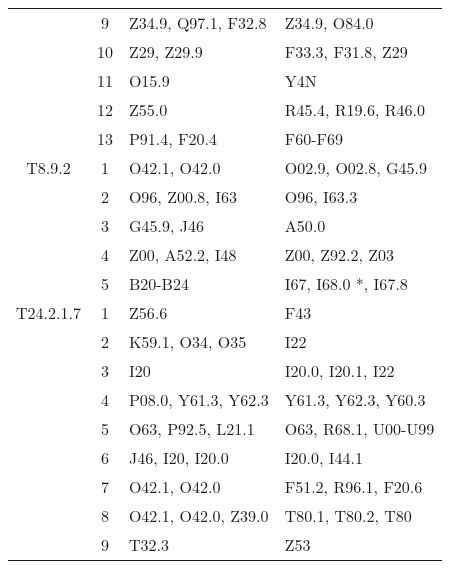 \begin{table}[htbp]
\begin{tabular}{c c l l}
	 & 9 & Z34.9, Q97.1, F32.8 & Z34.9, O84.0 \\
	 & 10 & Z29, Z29.9 & F33.3, F31.8, Z29 \\
	 & 11 & O15.9 & Y4N \\
	 & 12 & Z55.0 & R45.4, R19.6, R46.0 \\
	 & 13 & P91.4, F20.4 & F60-F69 \\
	\addlinespace
	T8.9.2 & 1 & O42.1, O42.0 & O02.9, O02.8, G45.9 \\
	 & 2 & O96, Z00.8, I63 & O96, I63.3 \\
	 & 3 & G45.9, J46 & A50.0 \\
	 & 4 & Z00, A52.2, I48 & Z00, Z92.2, Z03 \\
	 & 5 & B20-B24 & I67, I68.0 *, I67.8 \\
	\addlinespace
	T24.2.1.7 & 1 & Z56.6 & F43 \\
	 & 2 & K59.1, O34, O35 & I22 \\
	 & 3 & I20 & I20.0, I20.1, I22 \\
	 & 4 & P08.0, Y61.3, Y62.3 & Y61.3, Y62.3, Y60.3 \\
	 & 5 & O63, P92.5, L21.1 & O63, R68.1, U00-U99 \\
	 & 6 & J46, I20, I20.0 & I20.0, I44.1 \\
	 & 7 & O42.1, O42.0 & F51.2, R96.1, F20.6 \\
	 & 8 & O42.1, O42.0, Z39.0 & T80.1, T80.2, T80 \\
	 & 9 & T32.3 & Z53 \\
	\bottomrule
\end{tabular}
\end{table}


